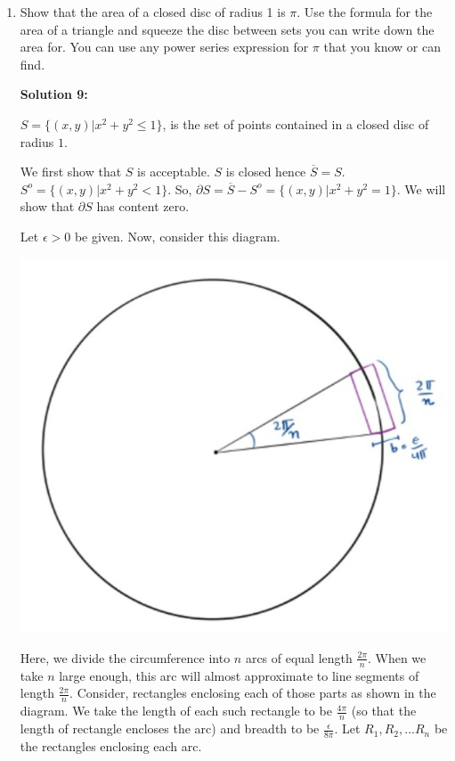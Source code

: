 \documentclass[11pt]{amsart}
\theoremstyle{definition}
\begin{document}
\begin{enumerate}[wide, labelwidth=!, labelindent=0pt]
\newpage
\item Show that the area of a closed disc of radius 1 is $\pi$. Use the formula for the area of a triangle and squeeze the disc between sets you can write down the area for. You can use any power series expression for $\pi$ that you know or can find. 

\textbf{Solution 9:}

$S = \{(x,y)|x^2+y^2 \le 1\}$, is the set of points contained in a closed disc of radius $1$.

We first show that $S$ is acceptable. $S$ is closed hence $\overline{S} = S$. $S^o = \{(x,y)|x^2+y^2 < 1\}$. So, $\partial S = \overline{S} - S^o = \{(x,y)|x^2+y^2 = 1\}$. We will show that $\partial S$ has content zero.

Let $\epsilon > 0$ be given. Now, consider this diagram.
\begin{center}
\includegraphics[scale = 0.2]{images/circ.jpeg}   
\end{center}
Here, we divide the circumference into $n$ arcs of equal length $\frac{2\pi}{n}$. When we take $n$ large enough, this arc will almost approximate to line segments of length $\frac{2\pi}{n}$. Consider, rectangles enclosing each of those parts as shown in the diagram. We take the length of each such rectangle to be $\frac{4\pi}{n}$ (so that the length of rectangle encloses the arc) and breadth to be $\frac{\epsilon}{8\pi}$. Let $R_1, R_2, ... R_n$ be the rectangles enclosing each arc.


\end{enumerate}
\end{document}
